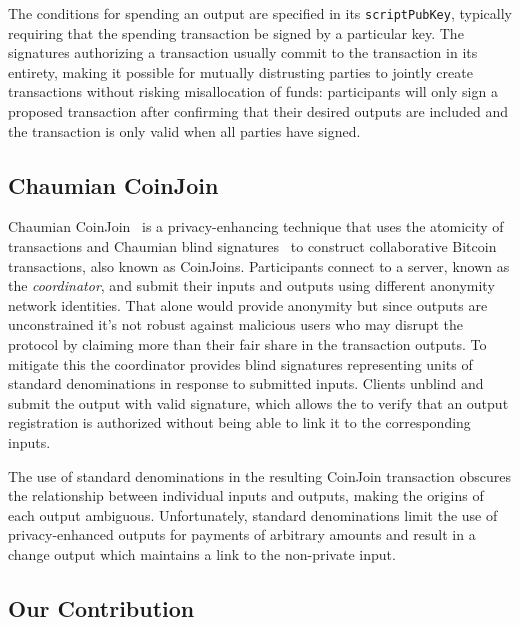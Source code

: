 \documentclass[a4paper]{article}
\begin{document}
The conditions for spending an output are specified in its \texttt{scriptPubKey}, typically requiring that the spending transaction be signed by a particular key. The signatures authorizing a transaction usually commit to the transaction in its entirety, making it possible for mutually distrusting parties to jointly create transactions without risking misallocation of funds: participants will only sign a proposed transaction after confirming that their desired outputs are included and the transaction is only valid when all parties have signed.

\subsection{Chaumian CoinJoin}

Chaumian CoinJoin~\cite{mizrahi2013blind,maxwell2013coinjoin,zerolink} is a privacy-enhancing technique that uses the atomicity of transactions and Chaumian blind signatures~\cite{chaum1983blind} to construct collaborative Bitcoin transactions, also known as CoinJoins. Participants connect to a server, known as the \emph{coordinator}, and submit their inputs and outputs using different anonymity network identities. That alone would provide anonymity but since outputs are unconstrained it's not robust against malicious users who may disrupt the protocol by claiming more than their fair share in the transaction outputs. To mitigate this the coordinator provides blind signatures representing units of standard denominations in response to submitted inputs. Clients unblind and submit the output with valid signature, which allows the to verify that an output registration is authorized without being able to link it to the corresponding inputs.

The use of standard denominations in the resulting CoinJoin transaction obscures the relationship between individual inputs and outputs, making the origins of each output ambiguous. Unfortunately, standard denominations limit the use of privacy-enhanced outputs for payments of arbitrary amounts and result in a change output which maintains a link to the non-private input.

\subsection{Our Contribution}
\end{document}
